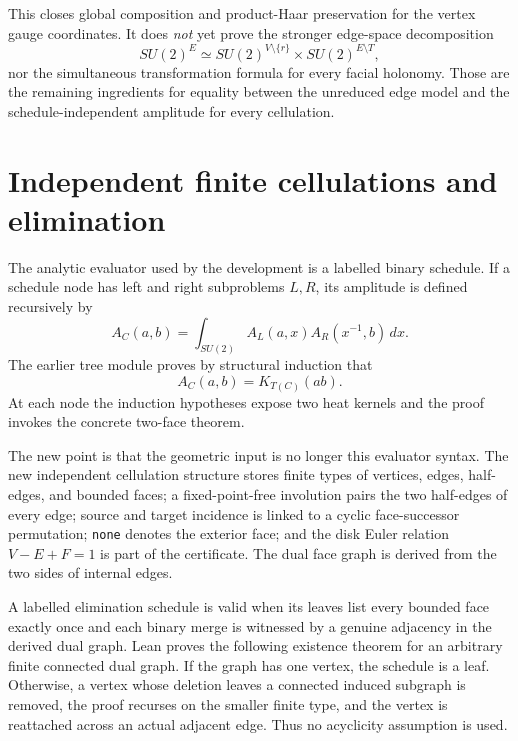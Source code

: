 \documentclass[11pt,a4paper]{article}
\theoremstyle{remark}
\begin{document}
This closes global composition and product-Haar preservation for the vertex
gauge coordinates.  It does \emph{not} yet prove the stronger edge-space
decomposition
\[
 SU(2)^E\simeq SU(2)^{V\setminus\{r\}}\times SU(2)^{E\setminus T},
\]
nor the simultaneous transformation formula for every facial holonomy.  Those
are the remaining ingredients for equality between the unreduced edge model
and the schedule-independent amplitude for every cellulation.

\section{Independent finite cellulations and elimination}

The analytic evaluator used by the development is a labelled binary schedule.
If a schedule node has left and right subproblems $L,R$, its amplitude is
defined recursively by
\[
  A_C(a,b)=\int_{SU(2)} A_L(a,x)A_R(x^{-1},b)\,dx.
\]
The earlier tree module proves by structural induction that
\[
  A_C(a,b)=K_{T(C)}(ab).
\]
At each node the induction hypotheses expose two heat kernels and the proof
invokes the concrete two-face theorem.

The new point is that the geometric input is no longer this evaluator syntax.
The new independent cellulation structure stores finite types of
vertices, edges, half-edges, and bounded faces; a fixed-point-free involution
pairs the two half-edges of every edge; source and target incidence is linked
to a cyclic face-successor permutation; \texttt{none} denotes the exterior
face; and the disk Euler relation $V-E+F=1$ is part of the certificate.  The
dual face graph is derived from the two sides of internal edges.

A labelled elimination schedule is valid when its leaves list every bounded
face exactly once and each binary merge is witnessed by a genuine adjacency
in the derived dual graph.  Lean proves the following existence theorem for an
arbitrary finite connected dual graph.  If the graph has one vertex, the
schedule is a leaf.  Otherwise, a vertex whose deletion leaves a connected
induced subgraph is removed, the proof recurses on the smaller finite type,
and the vertex is reattached across an actual adjacent edge.  Thus no
acyclicity assumption is used.
\end{document}
